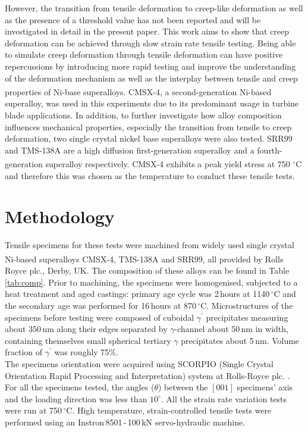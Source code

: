 \documentclass[a4paper,12pt,times,numbered,print,index]{Classes/PhDThesisPSnPDF}
\begin{document}
However, the transition from tensile deformation to creep-like deformation as well as the presence of a threshold value has not been reported and will be investigated in detail in the present paper. %
This work aims to show that creep deformation can be achieved through slow strain rate tensile testing. Being able to simulate creep deformation through tensile deformation can have positive repercussions by introducing more rapid testing and improve the understanding of the deformation mechanism as well as the interplay between tensile and creep properties of Ni-base superalloys.
CMSX-4\textsuperscript{\textregistered}, a second-generation Ni-based superalloy, was used in this experiments due to its predominant usage in turbine blade applications. In addition, to further investigate how alloy composition influences mechanical properties, especially the transition from tensile to creep deformation, two single crystal nickel base superalloys were also tested.
SRR99 and TMS-138A are a high diffusion first-generation superalloy and a fourth-generation superalloy respectively. CMSX-4\textsuperscript{\textregistered} exhibits a peak yield stress at 750 $^\circ{}$C and therefore this was chosen as the temperature to conduct these tensile tests.

\section*{Methodology}
Tensile specimens for these tests were machined from widely used single crystal Ni-based superalloys CMSX-4\textsuperscript{\textregistered}, TMS-138A and SRR99, all provided by Rolls Royce plc., Derby, UK. The composition of these alloys can be found in Table \ref{tab:comp}. Prior to machining, the specimens were homogenised, subjected to a heat treatment and aged castings: primary age cycle was 2\,hours at 1140\,$^\circ{}$C and the secondary age was performed for 16\,hours at 870\,$^\circ{}$C. Microstructures of the specimens before testing were composed of cuboidal $\gamma^\prime$ precipitates measuring about 350\,nm along their edges separated by $\gamma$-channel about 50\,nm in width, containing themselves small spherical tertiary $\gamma$ precipitates about 5\,nm. Volume fraction of $\gamma^\prime$ was roughly 75\%.\\The specimens orientation were acquired using SCORPIO (Single Crystal Orientation Rapid Processing and Interpretation) system at Rolls-Royce plc. \cite{jones1995rolls,smith1999industrial}. For all the specimens tested, the angles ($\theta$) between the $[001]$ specimens' axis and the loading direction was less than $10^\circ$. All the strain rate variation tests were run at 750\,$^\circ$C. High temperature, strain-controlled tensile tests were performed using an Instron\,8501\,-\,100\,kN servo-hydraulic machine.
\end{document}
